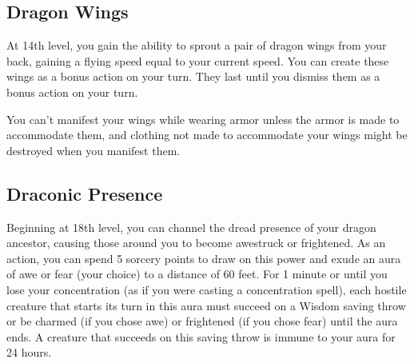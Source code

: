 \subsection{Dragon Wings}

At 14th level, you gain the ability to sprout a pair of dragon wings from your back, gaining a flying speed equal to your current speed. You can create these wings as a bonus action on your turn. They last until you dismiss them as a bonus action on your turn.

You can't manifest your wings while wearing armor unless the armor is made to accommodate them, and clothing not made to accommodate your wings might be destroyed when you manifest them.

\subsection{Draconic Presence}

Beginning at 18th level, you can channel the dread presence of your dragon ancestor, causing those around you to become awestruck or frightened. As an action, you can spend 5 sorcery points to draw on this power and exude an aura of awe or fear (your choice) to a distance of 60 feet. For 1 minute or until you lose your concentration (as if you were casting a concentration spell), each hostile creature that starts its turn in this aura must succeed on a Wisdom saving throw or be charmed (if you chose awe) or frightened (if you chose fear) until the aura ends. A creature that succeeds on this saving throw is immune to your aura for 24 hours.